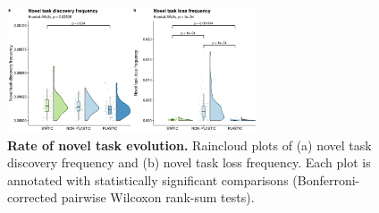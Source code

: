 \begin{figure}[h!]
    \centering
    \includegraphics[width=0.66\textwidth]{media-complex-traits-pace-panel.pdf}
    \caption{\small
    \textbf{Rate of novel task evolution.}
    Raincloud plots of
    (a) novel task discovery frequency
    and (b) novel task loss frequency.
    Each plot is annotated with statistically significant comparisons (Bonferroni-corrected pairwise Wilcoxon rank-sum tests).
    }
    \label{fig:complex-traits-rate}
\end{figure}